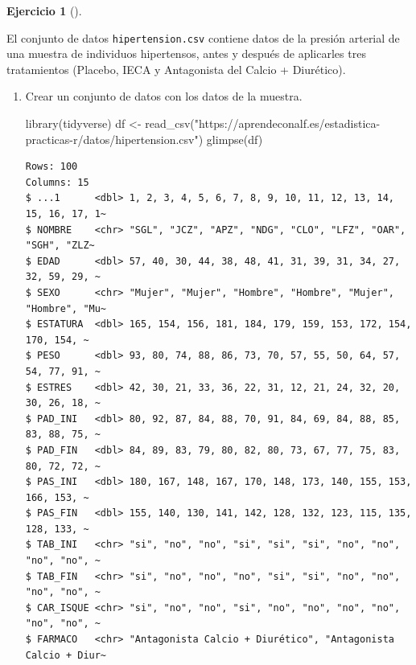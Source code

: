 \documentclass[
  a4paper,
]{scrreport}
\newenvironment{Shaded}{\begin{snugshade}}{\end{snugshade}}
\newcommand{\FunctionTok}[1]{\textcolor[rgb]{0.28,0.35,0.67}{#1}}
\newcommand{\NormalTok}[1]{\textcolor[rgb]{0.00,0.23,0.31}{#1}}
\newcommand{\OtherTok}[1]{\textcolor[rgb]{0.00,0.23,0.31}{#1}}
\newcommand{\StringTok}[1]{\textcolor[rgb]{0.13,0.47,0.30}{#1}}
\theoremstyle{definition}
\newtheorem{exercise}{Ejercicio}[chapter]
\theoremstyle{remark}
\begin{document}
\begin{exercise}[]\protect\hypertarget{exr-contraste-hipotesis-media-hipertension}{}\label{exr-contraste-hipotesis-media-hipertension}

El conjunto de datos \texttt{hipertension.csv} contiene datos de la
presión arterial de una muestra de individuos hipertensos, antes y
después de aplicarles tres tratamientos (Placebo, IECA y Antagonista del
Calcio + Diurético).

\begin{enumerate}
\def\labelenumi{\alph{enumi}.}
\item
  Crear un conjunto de datos con los datos de la muestra.

  \begin{tcolorbox}[enhanced jigsaw, breakable, toptitle=1mm, colbacktitle=quarto-callout-tip-color!10!white, rightrule=.15mm, opacityback=0, opacitybacktitle=0.6, titlerule=0mm, coltitle=black, colframe=quarto-callout-tip-color-frame, colback=white, bottomtitle=1mm, leftrule=.75mm, toprule=.15mm, title=\textcolor{quarto-callout-tip-color}{\faLightbulb}\hspace{0.5em}{Solución}, arc=.35mm, bottomrule=.15mm, left=2mm]

\begin{Shaded}
\begin{Highlighting}[]
\FunctionTok{library}\NormalTok{(tidyverse)}
\NormalTok{df }\OtherTok{\textless{}{-}} \FunctionTok{read\_csv}\NormalTok{(}\StringTok{"https://aprendeconalf.es/estadistica{-}practicas{-}r/datos/hipertension.csv"}\NormalTok{)}
\FunctionTok{glimpse}\NormalTok{(df)}
\end{Highlighting}
\end{Shaded}

\begin{verbatim}
Rows: 100
Columns: 15
$ ...1      <dbl> 1, 2, 3, 4, 5, 6, 7, 8, 9, 10, 11, 12, 13, 14, 15, 16, 17, 1~
$ NOMBRE    <chr> "SGL", "JCZ", "APZ", "NDG", "CLO", "LFZ", "OAR", "SGH", "ZLZ~
$ EDAD      <dbl> 57, 40, 30, 44, 38, 48, 41, 31, 39, 31, 34, 27, 32, 59, 29, ~
$ SEXO      <chr> "Mujer", "Mujer", "Hombre", "Hombre", "Mujer", "Hombre", "Mu~
$ ESTATURA  <dbl> 165, 154, 156, 181, 184, 179, 159, 153, 172, 154, 170, 154, ~
$ PESO      <dbl> 93, 80, 74, 88, 86, 73, 70, 57, 55, 50, 64, 57, 54, 77, 91, ~
$ ESTRES    <dbl> 42, 30, 21, 33, 36, 22, 31, 12, 21, 24, 32, 20, 30, 26, 18, ~
$ PAD_INI   <dbl> 80, 92, 87, 84, 88, 70, 91, 84, 69, 84, 88, 85, 83, 88, 75, ~
$ PAD_FIN   <dbl> 84, 89, 83, 79, 80, 82, 80, 73, 67, 77, 75, 83, 80, 72, 72, ~
$ PAS_INI   <dbl> 180, 167, 148, 167, 170, 148, 173, 140, 155, 153, 166, 153, ~
$ PAS_FIN   <dbl> 155, 140, 130, 141, 142, 128, 132, 123, 115, 135, 128, 133, ~
$ TAB_INI   <chr> "si", "no", "no", "si", "si", "si", "no", "no", "no", "no", ~
$ TAB_FIN   <chr> "si", "no", "no", "no", "si", "si", "no", "no", "no", "no", ~
$ CAR_ISQUE <chr> "si", "no", "no", "si", "no", "no", "no", "no", "no", "no", ~
$ FARMACO   <chr> "Antagonista Calcio + Diurético", "Antagonista Calcio + Diur~
\end{verbatim}


\end{tcolorbox}
\end{enumerate}
\end{exercise}
\end{document}
